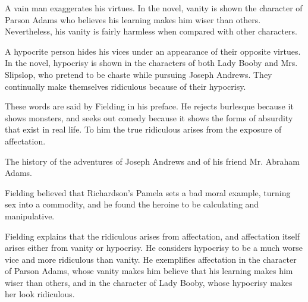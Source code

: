 \documentclass[12pt, a4paper]{article}
\begin{document}

\ind A vain man exaggerates his virtues. In the novel, vanity is shown the character of Parson Adams who
believes his learning makes him wiser than  others. Nevertheless, his vanity is fairly 
harmless when compared with other characters.


\restoregeometry


\ind A hypocrite person hides his vices under an appearance of their opposite virtues. 
In the novel, hypocrisy is shown in the characters of both
Lady Booby and Mrs. Slipslop, who pretend to be chaste while pursuing Joseph Andrews.
They continually make themselves ridiculous because of their hypocrisy.



These words are said by Fielding in his preface. He rejects burlesque because it shows monsters,
and seeks out comedy because it shows the forms of absurdity that exist in real life. 
To him the true ridiculous arises from the exposure of affectation.


The history of the adventures of Joseph Andrews and of his friend Mr. Abraham Adams.


Fielding believed that Richardson's Pamela sets a bad moral
example, turning sex into a commodity, and he found the heroine to be calculating and
manipulative.



Fielding explains that the ridiculous arises from affectation, and 
affectation itself arises either from vanity or hypocrisy.
He considers hypocrisy to be a much worse vice and more ridiculous than vanity.
He exemplifies affectation in the character of Parson Adams, whose vanity makes him 
believe that his learning makes him wiser than others, and in the character of Lady
Booby, whose hypocrisy makes her look ridiculous.

\end{document}
